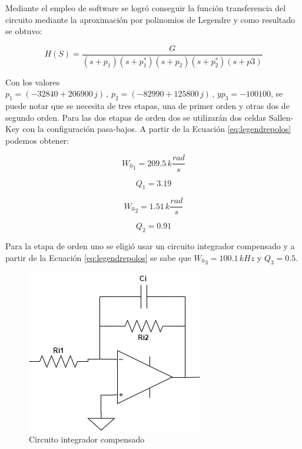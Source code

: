 \documentclass[11pt, a4paper]{article}
\begin{document}
	Mediante el empleo de software se logró conseguir la función transferencia del circuito mediante la aproximación por polinomios de Legendre y como resultado se obtuvo:
	
\begin{equation}
	H(S) = \dfrac{G}{(s+p_1)(s+p_1^*)(s+p_2)(s+p_2^*)(s+p3)}
\label{eq:legendrepolos}
\end{equation}

	Con los valores $p_1 = (-32840 + 206900 \, j ) \, , \, p_2 = (-82990 + 125800 \, j) \, , \, y p_3 = -100100$, se puede notar que se necesita de tres etapas, una de primer orden y otras dos de segundo orden.
	Para las dos etapas de orden dos se utilizarán dos celdas Sallen-Key con la configuración pasa-bajos. A partir de la Ecuación \ref{eq:legendrepolos} podemos obtener:
	
\begin{equation}
{W_0}_1 = 209.5 \, k \frac{rad}{s}
\label{eq:wo1Legendre}
\end{equation}

\begin{equation}
Q_1 = 3.19
\label{eq:Q1Legendre}
\end{equation}

\begin{equation}
{W_0}_2 = 1.51 \, k \frac{rad}{s}
\label{eq:wo2Legendre}
\end{equation}

\begin{equation}
Q_2 = 0.91
\label{eq:Q2Legendre}
\end{equation}

	Para la etapa de orden uno se eligió usar un circuito integrador compensado y a partir de la Ecuación \eqref{eq:legendrepolos} se sabe que ${W_0}_3 = 100.1 \, kHz$ y $Q_3 = 0.5$.
	
\begin{figure}[H]
	\centering
	\includegraphics[scale=0.5]{integradorcompensado.jpg}
	\caption{Circuito integrador compensado}
	\label{fig:sallenkeypasabajos}
\end{figure}
	
\end{document}
